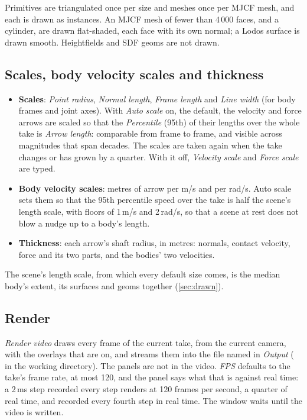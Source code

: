 Primitives are triangulated once per size and meshes once per MJCF mesh, and each is drawn as instances. An MJCF mesh of fewer than 4\,000 faces, and a cylinder, are drawn flat-shaded, each face with its own normal; a Lodos surface is drawn smooth. Heightfields and SDF geoms are not drawn.

\subsection{Scales, body velocity scales and thickness}\label{sec:scales}

\begin{itemize}
\item \textbf{Scales}: \emph{Point radius}, \emph{Normal length}, \emph{Frame length} and \emph{Line width} (for body frames and joint axes). With \emph{Auto scale} on, the default, the velocity and force arrows are scaled so that the \emph{Percentile} (95th) of their lengths over the whole take is \emph{Arrow length}: comparable from frame to frame, and visible across magnitudes that span decades. The scales are taken again when the take changes or has grown by a quarter. With it off, \emph{Velocity scale} and \emph{Force scale} are typed.
\item \textbf{Body velocity scales}: metres of arrow per m/s and per rad/s. Auto scale sets them so that the 95th percentile speed over the take is half the scene's length scale, with floors of 1\,m/s and 2\,rad/s, so that a scene at rest does not blow a nudge up to a body's length.
\item \textbf{Thickness}: each arrow's shaft radius, in metres: normals, contact velocity, force and its two parts, and the bodies' two velocities.
\end{itemize}

The scene's length scale, from which every default size comes, is the median body's extent, its surfaces and geoms together (\cref{sec:drawn}).

\subsection{Render}\label{sec:render}

\emph{Render video} draws every frame of the current take, from the current camera, with the overlays that are on, and streams them into the file named in \emph{Output} ( in the working directory). The panels are not in the video. \emph{FPS} defaults to the take's frame rate, at most 120, and the panel says what that is against real time: a 2\,ms step recorded every step renders at 120 frames per second, a quarter of real time, and recorded every fourth step in real time. The window waits until the video is written.

